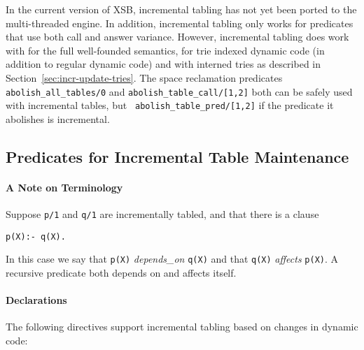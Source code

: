 In the current version of XSB, incremental tabling has not yet been
ported to the multi-threaded engine.  In addition, incremental tabling
only works for predicates that use both call and answer variance.
However, incremental tabling does work with for the full well-founded
semantics, for trie indexed dynamic code (in addition to regular
dynamic code) and with interned tries as described in
Section~\ref{sec:incr-update-tries}.  The space reclamation predicates
{\tt abolish\_all\_tables/0} and {\tt abolish\_table\_call/[1,2]} both
can be safely used with incremental tables, but {\tt
  abolish\_table\_pred/[1,2]} if the predicate it abolishes is
incremental.

\subsection{Predicates for Incremental Table Maintenance} \label{sec:incr-preds1}

\paragraph{A Note on Terminology}
%
Suppose {\tt p/1} and {\tt q/1} are incrementally tabled, and that
there is a clause
%
\begin{verbatim}
p(X):- q(X).
\end{verbatim}
%
In this case we say that {\tt p(X)} {\em depends\_on} {\tt q(X)} and
that {\tt q(X)} {\em affects} {\tt p(X)}.  A recursive predicate both
depends on and affects itself.


\paragraph{Declarations} The following directives support incremental
tabling based on changes in dynamic code: 


